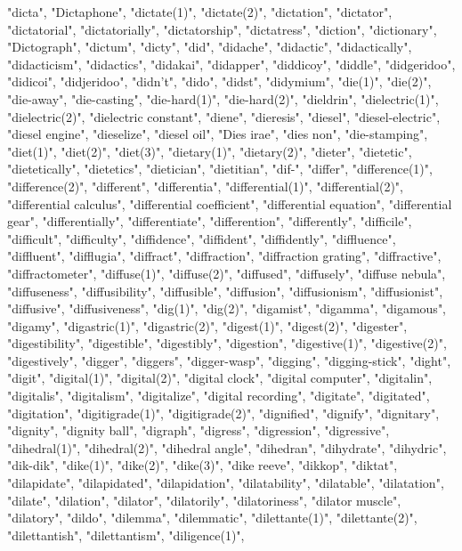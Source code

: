 "dicta",
"Dictaphone",
"dictate(1)",
"dictate(2)",
"dictation",
"dictator",
"dictatorial",
"dictatorially",
"dictatorship",
"dictatress",
"diction",
"dictionary",
"Dictograph",
"dictum",
"dicty",
"did",
"didache",
"didactic",
"didactically",
"didacticism",
"didactics",
"didakai",
"didapper",
"diddicoy",
"diddle",
"didgeridoo",
"didicoi",
"didjeridoo",
"didn't",
"dido",
"didst",
"didymium",
"die(1)",
"die(2)",
"die-away",
"die-casting",
"die-hard(1)",
"die-hard(2)",
"dieldrin",
"dielectric(1)",
"dielectric(2)",
"dielectric constant",
"diene",
"dieresis",
"diesel",
"diesel-electric",
"diesel engine",
"dieselize",
"diesel oil",
"Dies irae",
"dies non",
"die-stamping",
"diet(1)",
"diet(2)",
"diet(3)",
"dietary(1)",
"dietary(2)",
"dieter",
"dietetic",
"dietetically",
"dietetics",
"dietician",
"dietitian",
"dif-",
"differ",
"difference(1)",
"difference(2)",
"different",
"differentia",
"differential(1)",
"differential(2)",
"differential calculus",
"differential coefficient",
"differential equation",
"differential gear",
"differentially",
"differentiate",
"differention",
"differently",
"difficile",
"difficult",
"difficulty",
"diffidence",
"diffident",
"diffidently",
"diffluence",
"diffluent",
"difflugia",
"diffract",
"diffraction",
"diffraction grating",
"diffractive",
"diffractometer",
"diffuse(1)",
"diffuse(2)",
"diffused",
"diffusely",
"diffuse nebula",
"diffuseness",
"diffusibility",
"diffusible",
"diffusion",
"diffusionism",
"diffusionist",
"diffusive",
"diffusiveness",
"dig(1)",
"dig(2)",
"digamist",
"digamma",
"digamous",
"digamy",
"digastric(1)",
"digastric(2)",
"digest(1)",
"digest(2)",
"digester",
"digestibility",
"digestible",
"digestibly",
"digestion",
"digestive(1)",
"digestive(2)",
"digestively",
"digger",
"diggers",
"digger-wasp",
"digging",
"digging-stick",
"dight",
"digit",
"digital(1)",
"digital(2)",
"digital clock",
"digital computer",
"digitalin",
"digitalis",
"digitalism",
"digitalize",
"digital recording",
"digitate",
"digitated",
"digitation",
"digitigrade(1)",
"digitigrade(2)",
"dignified",
"dignify",
"dignitary",
"dignity",
"dignity ball",
"digraph",
"digress",
"digression",
"digressive",
"dihedral(1)",
"dihedral(2)",
"dihedral angle",
"dihedran",
"dihydrate",
"dihydric",
"dik-dik",
"dike(1)",
"dike(2)",
"dike(3)",
"dike reeve",
"dikkop",
"diktat",
"dilapidate",
"dilapidated",
"dilapidation",
"dilatability",
"dilatable",
"dilatation",
"dilate",
"dilation",
"dilator",
"dilatorily",
"dilatoriness",
"dilator muscle",
"dilatory",
"dildo",
"dilemma",
"dilemmatic",
"dilettante(1)",
"dilettante(2)",
"dilettantish",
"dilettantism",
"diligence(1)",
